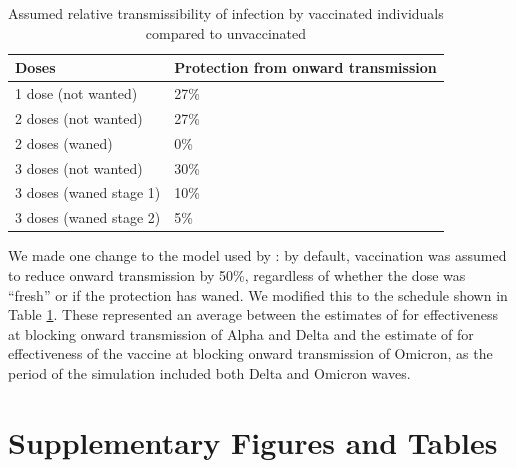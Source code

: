 \documentclass{article}
\begin{document}
\begin{table}

\caption{\label{tab:onward}Assumed relative transmissibility of infection by vaccinated individuals compared to unvaccinated}
\centering
\begin{tabular}[t]{ll}
\toprule
Doses & Protection from onward transmission\\
\midrule
1 dose (not wanted) & 27\%\\
2 doses (not wanted) & 27\%\\
2 doses (waned) & 0\%\\
3 doses (not wanted) & 30\%\\
3 doses (waned stage 1) & 10\%\\
3 doses (waned stage 2) & 5\%\\
\bottomrule
\end{tabular}
\end{table}

We made one change to the model used by \citep{watsonoliverj.COVID19LMICReports2022}: by default, vaccination was assumed to reduce onward transmission by 50\%, regardless of whether the dose was ``fresh'' or if the protection has waned. We modified this to the schedule shown in Table \ref{tab:onward}. These represented an average between the estimates of \citep{eyreImpactSARSCoV2Vaccination2021a} for effectiveness at blocking onward transmission of Alpha and Delta and the estimate of \citep{tanInfectiousnessSARSCoV2Breakthrough2023} for effectiveness of the vaccine at blocking onward transmission of Omicron, as the period of the simulation included both Delta and Omicron waves.

\newpage

\section{Supplementary Figures and Tables}\label{supplementary-figures-and-tables}
\end{document}
